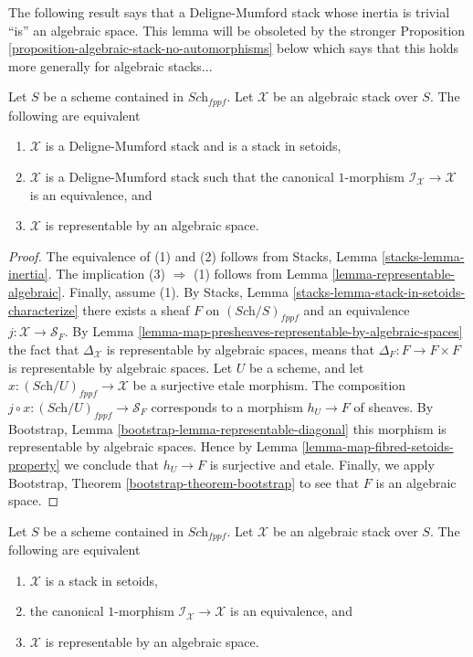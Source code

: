 \noindent
The following result says that a Deligne-Mumford stack whose inertia
is trivial ``is'' an algebraic space. This lemma will be obsoleted by
the stronger
Proposition \ref{proposition-algebraic-stack-no-automorphisms}
below which says that this holds more generally for algebraic stacks...

\begin{lemma}
\label{lemma-algebraic-stack-no-automorphisms}
Let $S$ be a scheme contained in $\textit{Sch}_{fppf}$.
Let $\mathcal{X}$ be an algebraic stack over $S$.
The following are equivalent
\begin{enumerate}
\item $\mathcal{X}$ is a Deligne-Mumford stack and is a stack in setoids,
\item $\mathcal{X}$ is a Deligne-Mumford stack such that the
canonical $1$-morphism $\mathcal{I}_\mathcal{X} \to \mathcal{X}$
is an equivalence, and
\item $\mathcal{X}$ is representable by an algebraic space.
\end{enumerate}
\end{lemma}

\begin{proof}
The equivalence of (1) and (2) follows from
Stacks, Lemma \ref{stacks-lemma-inertia}.
The implication (3) $\Rightarrow$ (1) follows from
Lemma \ref{lemma-representable-algebraic}.
Finally, assume (1). By
Stacks, Lemma \ref{stacks-lemma-stack-in-setoids-characterize}
there exists a sheaf $F$ on $(\textit{Sch}/S)_{fppf}$
and an equivalence $j : \mathcal{X} \to \mathcal{S}_F$. By
Lemma \ref{lemma-map-presheaves-representable-by-algebraic-spaces}
the fact that $\Delta_\mathcal{X}$ is representable by algebraic
spaces, means that $\Delta_F : F \to F \times F$
is representable by algebraic spaces.
Let $U$ be a scheme, and let $x : (\textit{Sch}/U)_{fppf} \to \mathcal{X}$
be a surjective etale morphism. The composition
$j \circ x : (\textit{Sch}/U)_{fppf} \to \mathcal{S}_F$
corresponds to a morphism $h_U \to F$ of sheaves. By
Bootstrap, Lemma \ref{bootstrap-lemma-representable-diagonal}
this morphism is representable by algebraic spaces.
Hence by
Lemma \ref{lemma-map-fibred-setoids-property}
we conclude that $h_U \to F$ is surjective and etale.
Finally, we apply
Bootstrap, Theorem \ref{bootstrap-theorem-bootstrap}
to see that $F$ is an algebraic space.
\end{proof}

\begin{proposition}
\label{proposition-algebraic-stack-no-automorphisms}
Let $S$ be a scheme contained in $\textit{Sch}_{fppf}$.
Let $\mathcal{X}$ be an algebraic stack over $S$.
The following are equivalent
\begin{enumerate}
\item $\mathcal{X}$ is a stack in setoids,
\item the canonical $1$-morphism $\mathcal{I}_\mathcal{X} \to \mathcal{X}$
is an equivalence, and
\item $\mathcal{X}$ is representable by an algebraic space.
\end{enumerate}
\end{proposition}

